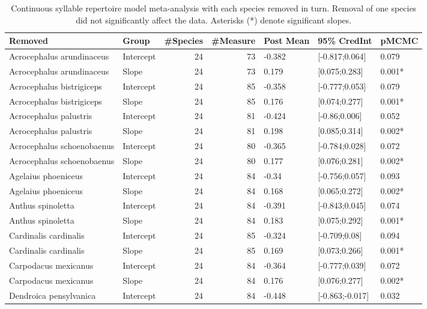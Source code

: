 \documentclass{article}
\begin{document}
  \begin{table}[H]
  \centering
  \caption{Continuous syllable repertoire model meta-analysis with each species removed in turn.  Removal of one species did not significantly affect the data. Asterisks (*) denote significant slopes.} 
  \begin{tabular}{llrrlll}
  \hline
  Removed & Group & \#Species & \#Measure & Post Mean & 95\% CredInt & pMCMC \\ 
  \hline
  Acrocephalus arundinaceus & Intercept &  24 &  73 & -0.382 & [-0.817;0.064] & 0.079 \\ 
  Acrocephalus arundinaceus & Slope &  24 &  73 & 0.179 & [0.075;0.283] & 0.001* \\ 
  Acrocephalus bistrigiceps & Intercept &  24 &  85 & -0.358 & [-0.777;0.053] & 0.079 \\ 
  Acrocephalus bistrigiceps & Slope &  24 &  85 & 0.176 & [0.074;0.277] & 0.001* \\ 
  Acrocephalus palustris & Intercept &  24 &  81 & -0.424 & [-0.86;0.006] & 0.052 \\ 
  Acrocephalus palustris & Slope &  24 &  81 & 0.198 & [0.085;0.314] & 0.002* \\ 
  Acrocephalus schoenobaenus & Intercept &  24 &  80 & -0.365 & [-0.784;0.028] & 0.072 \\ 
  Acrocephalus schoenobaenus & Slope &  24 &  80 & 0.177 & [0.076;0.281] & 0.002* \\ 
  Agelaius phoeniceus & Intercept &  24 &  84 & -0.34 & [-0.756;0.057] & 0.093 \\ 
  Agelaius phoeniceus & Slope &  24 &  84 & 0.168 & [0.065;0.272] & 0.002* \\ 
  Anthus spinoletta & Intercept &  24 &  84 & -0.391 & [-0.843;0.045] & 0.074 \\ 
  Anthus spinoletta & Slope &  24 &  84 & 0.183 & [0.075;0.292] & 0.001* \\ 
  Cardinalis cardinalis & Intercept &  24 &  85 & -0.324 & [-0.709;0.08] & 0.094 \\ 
  Cardinalis cardinalis & Slope &  24 &  85 & 0.169 & [0.073;0.266] & 0.001* \\ 
  Carpodacus mexicanus & Intercept &  24 &  84 & -0.364 & [-0.777;0.039] & 0.072 \\ 
  Carpodacus mexicanus & Slope &  24 &  84 & 0.176 & [0.076;0.277] & 0.002* \\ 
  Dendroica pensylvanica & Intercept &  24 &  84 & -0.448 & [-0.863;-0.017] & 0.032 \\ 

\end{tabular}
\end{table}
\end{document}
